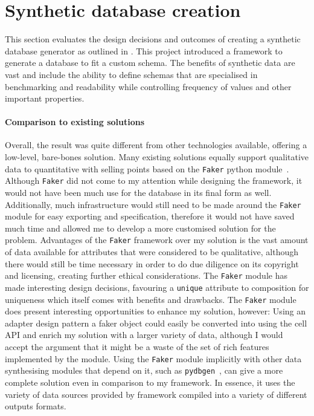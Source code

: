 \section{Synthetic database creation}\label{sec:evaluation:syntheticdatabase}
This section evaluates the design decisions and outcomes of creating a synthetic
database generator as outlined in . This
project introduced a framework to generate a database to fit a custom schema. The
benefits of synthetic data are vast and include the ability to define schemas
that are specialised in benchmarking and readability while controlling frequency
of values and other important properties.

\paragraph{Comparison to existing solutions} Overall, the result was quite different from other technologies available,
offering a low-level, bare-bones solution. Many existing solutions equally support
qualitative data to quantitative with selling points based on the
\lstinline{Faker} python module~\cite{Faker}. Although \lstinline{Faker} did not come to my
attention while designing the framework, it would not have been much use for the
 database in its final form as well. Additionally, much
infrastructure would still need to be made around the \lstinline{Faker} module
for easy exporting and specification, therefore it would not have saved much
time and allowed me to develop a more customised solution for the problem.
Advantages of the \lstinline{Faker} framework over my solution is the vast
amount of data available for attributes that were considered to be qualitative,
although there would still be time necessary in order to do due diligence on its
copyright and licensing, creating further ethical considerations. The \lstinline{Faker} module has made interesting
design decisions, favouring a \lstinline{unique} attribute to composition for
uniqueness which itself comes with benefits and drawbacks. The \lstinline{Faker}
module does present interesting opportunities to enhance my solution, however:
Using an adapter design pattern a faker object could easily be converted into
using the cell API and enrich my solution with a larger variety of data,
although I would accept the argument that it might be a waste of the set of rich
features implemented by the module. Using the \lstinline{Faker} module implicitly
with other data synthesising modules that depend on
it, such as \lstinline{pydbgen}~\cite{pydbgen}, can give a more complete solution even in
comparison to my framework. In essence, it uses the variety of data sources
provided by framework compiled into a variety of different outputs formats.

